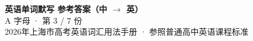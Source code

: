 \documentclass[10pt,a4paper]{article}
\begin{document}
\pagestyle{plain}

\begin{center}
{\LARGE\bfseries 英语单词默写 \quad 参考答案（中 $\to$ 英）}\\[0.22em]
{\large A 字母 · 第 3 / 7 份}\\[0.18em]
{\small 2026年上海市高考英语词汇用法手册 · 参照普通高中英语课程标准}
\end{center}

\vspace{0.2em}
\noindent{\color{rulegray}\rule{\textwidth}{0.8pt}}

\vspace{0.35em}

\vspace{0.25em}
\renewcommand{\arraystretch}{1.32}
\end{document}
